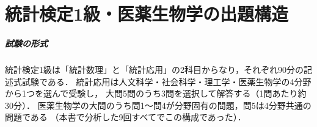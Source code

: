 \documentclass[a4paper,11pt,openany]{ltjsbook}
\begin{document}
\chapter*{統計検定1級・医薬生物学の出題構造}

\paragraph{試験の形式}
統計検定1級は「統計数理」と「統計応用」の2科目からなり，それぞれ90分の記述式試験である．
統計応用は人文科学・社会科学・理工学・医薬生物学の4分野から1つを選んで受験し，
大問5問のうち3問を選択して解答する（1問あたり約30分）\cite{web:lec,web:academaid}．
医薬生物学の大問のうち問1〜問4が分野固有の問題，問5は4分野共通の問題である
（本書で分析した9回すべてでこの構成であった）．
\end{document}
